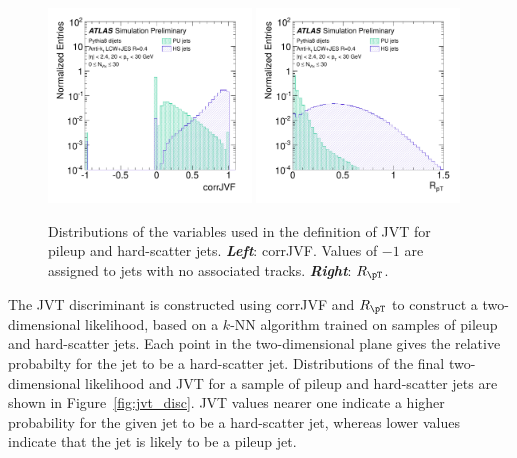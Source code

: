 \begin{figure}[!htb]
    \begin{center}
        \includegraphics[width=0.48\textwidth]{figures/chapter3/jets/jvt_corrJVF}
        \includegraphics[width=0.48\textwidth]{figures/chapter3/jets/jvt_rpt}
        \caption{
            Distributions of the variables used in the definition of JVT for pileup and hard-scatter jets.
            \textit{\textbf{Left}}: corrJVF. Values of $-1$ are assigned to jets with no associated tracks.
            \textit{\textbf{Right}}: $R_{\pT}$.
        }
        \label{fig:jvt_vars}
    \end{center}
\end{figure}

The JVT discriminant is constructed using corrJVF and $R_{\pT}$ to construct a two-dimensional likelihood,
based on a $k$-NN algorithm trained on samples of pileup and hard-scatter jets.
Each point in the two-dimensional plane gives the relative probabilty for the jet to be a hard-scatter jet.
Distributions of the final two-dimensional likelihood and JVT for a sample of pileup
and hard-scatter jets are shown in Figure~\ref{fig:jvt_disc}.
JVT values nearer one indicate a higher probability for the given jet to be a hard-scatter jet, whereas
lower values indicate that the jet is likely to be a pileup jet.

